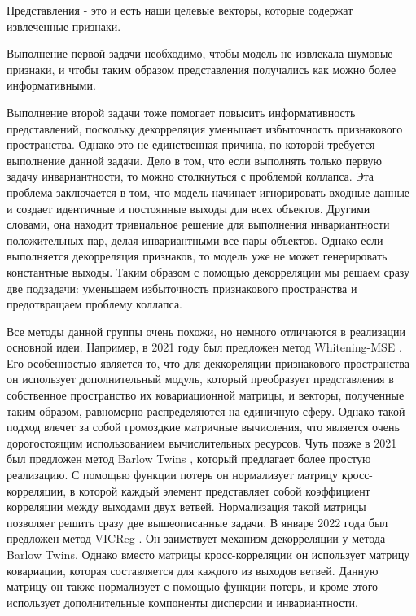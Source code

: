 Представления - это и есть наши целевые векторы, которые содержат извлеченные признаки.

Выполнение первой задачи необходимо, чтобы модель не извлекала шумовые признаки, и чтобы таким образом представления получались как можно более информативными.

Выполнение второй задачи тоже помогает повысить информативность представлений, поскольку декорреляция уменьшает избыточность признакового пространства. Однако это не единственная причина, по которой требуется выполнение данной задачи. Дело в том, что если выполнять только первую задачу инвариантности, то можно столкнуться с проблемой коллапса. Эта проблема заключается в том, что модель начинает игнорировать входные данные и создает идентичные и постоянные выходы для всех объектов. Другими словами, она находит тривиальное решение для выполнения инвариантности положительных пар, делая инвариантными все пары объектов. Однако если выполняется декорреляция признаков, то модель уже не может генерировать константные выходы. Таким образом с помощью декорреляции мы решаем сразу две подзадачи: уменьшаем избыточность признакового пространства и предотвращаем проблему коллапса.

Все методы данной группы очень похожи, но немного отличаются в реализации основной идеи. Например, в 2021 году был предложен метод Whitening-MSE \cite{Whitening_MSE}. Его особенностью является то, что для деккореляции признакового пространства он использует дополнительный модуль, который преобразует представления
в собственное пространство их ковариационной матрицы, и векторы, полученные таким образом, равномерно распределяются на единичную сферу. Однако такой подход влечет за собой громоздкие матричные вычисления, что является очень дорогостоящим использованием вычислительных ресурсов. Чуть позже в 2021 был предложен метод Barlow Twins \cite{Barlow_Twins}, который предлагает более простую реализацию. С помощью функции потерь он нормализует матрицу кросс-корреляции, в которой каждый элемент представляет собой коэффициент корреляции между выходами двух ветвей. Нормализация такой матрицы позволяет решить сразу две вышеописанные задачи. В январе 2022 года был предложен метод VICReg \cite{Vicreg}. Он заимствует механизм декорреляции у метода Barlow Twins. Однако вместо матрицы кросс-корреляции он использует матрицу ковариации, которая составляется для каждого из выходов ветвей. Данную матрицу он также нормализует с помощью функции потерь, и кроме этого использует дополнительные компоненты дисперсии и инвариантности.


